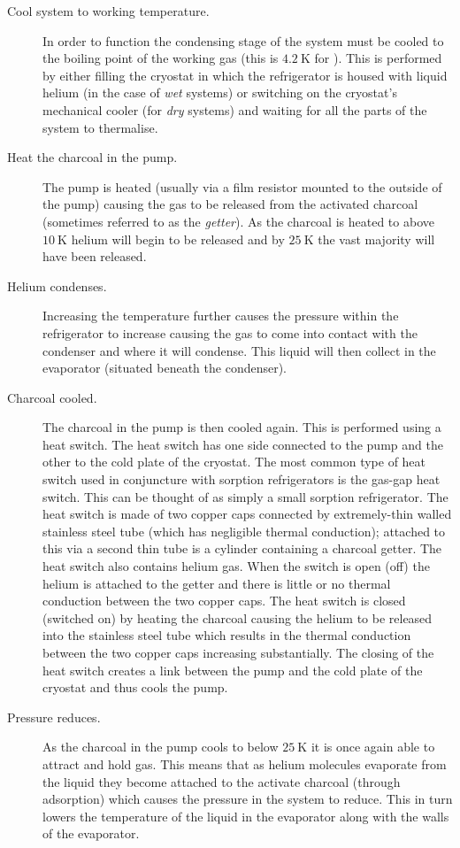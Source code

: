 \begin{description}
\item[Cool system to working temperature.] In order to function the condensing stage of the system must be cooled to the boiling point of the working gas (this is $4.2~\mathrm{K}$ for ). This is performed by either filling the cryostat in which the refrigerator is housed with liquid helium (in the case of \textit{wet} systems) or switching on the cryostat's mechanical cooler (for \textit{dry} systems) and waiting for all the parts of the system to thermalise.
\item[Heat the charcoal in the pump.] The pump is heated (usually via a film resistor mounted to the outside of the pump) causing the gas to be released from the activated charcoal (sometimes referred to as the \textit{getter}). As the charcoal is heated to above $10~\mathrm{K}$ helium will begin to be released and by $25~\mathrm{K}$ the vast majority will have been released.
\item[Helium condenses.] Increasing the temperature further causes the pressure within the refrigerator to increase causing the gas to come into contact with the condenser and where it will condense. This liquid will then collect in the evaporator (situated beneath the condenser).
\item[Charcoal cooled.] The charcoal in the pump is then cooled again. This is performed using a heat switch. The heat switch has one side connected to the pump and the other to the cold plate of the cryostat. The most common type of heat switch used in conjuncture with sorption refrigerators is the gas-gap heat switch. This can be thought of as simply a small sorption refrigerator. The heat switch is made of two copper caps connected by extremely-thin walled stainless steel tube (which has negligible thermal conduction); attached to this via a second thin tube is a cylinder containing a charcoal getter. The heat switch also contains helium gas. When the switch is open (off) the helium is attached to the getter and there is little or no thermal conduction between the two copper caps. The heat switch is closed (switched on) by heating the charcoal causing the helium to be released into the stainless steel tube which results in the thermal conduction between the two copper caps increasing substantially. The closing of the heat switch creates a link between the pump and the cold plate of the cryostat and thus cools the pump.
\item[Pressure reduces.] As the charcoal in the pump cools to below $25~\mathrm{K}$ it is once again able to attract and hold gas. This means that as helium molecules evaporate from the liquid they become attached to the activate charcoal (through adsorption) which causes the pressure in the system to reduce. This in turn lowers the temperature of the liquid in the evaporator along with the walls of the evaporator.

\end{description}


